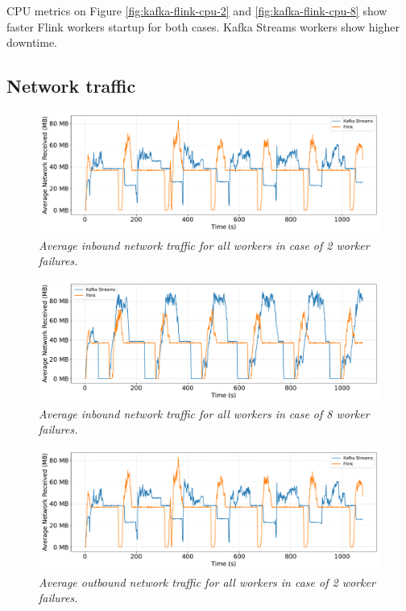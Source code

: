 CPU metrics on Figure \ref{fig:kafka-flink-cpu-2} and \ref{fig:kafka-flink-cpu-8}
show faster Flink workers startup for both cases.
Kafka Streams workers show higher downtime.


\newpage
\subsection{Network traffic}\label{subsec:inbound-network}

\begin{figure}[H]
    \centering
    \includegraphics[width=1\textwidth]{figures/kafka-flink/network-received-2pod-kafka-flink}
    \caption{\textit{Average inbound network traffic for all workers in case of 2 worker failures.}}
    \label{fig:kafka-flink-received-2}
\end{figure}


\begin{figure}[H]
    \centering
    \includegraphics[width=1\textwidth]{figures/kafka-flink/network-received-8pod-kafka-flink}
    \caption{\textit{Average inbound network traffic for all workers in case of 8 worker failures.}}
    \label{fig:kafka-flink-received-8}
\end{figure}

\begin{figure}[H]
    \centering
    \includegraphics[width=1\textwidth]{figures/kafka-flink/network-received-2pod-kafka-flink}
    \caption{\textit{Average outbound network traffic for all workers in case of 2 worker failures.}}
    \label{fig:kafka-flink-transmitted-2}
\end{figure}


